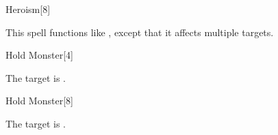 \begin{spellsection}[Greater]{Heroism}[8]
    \begin{spellheader}
    \end{spellheader}
    \begin{spellcontent}
        \begin{spelltargetinginfo}
        \end{spelltargetinginfo}
        \begin{spelleffects}
            \spellspecial This spell functions like , except that it affects multiple targets.
        \end{spelleffects}
    \end{spellcontent}
    \begin{spellfooter}
        \miscastexplode
    \end{spellfooter}
\end{spellsection}

\begin{spellsection}{Hold Monster}[4]
    \begin{spellheader}
    \end{spellheader}
    \begin{spellcontent}
        \begin{spelltargetinginfo}
        \end{spelltargetinginfo}
        \begin{spelleffects}
            \spelleffect The target is \immobilized.
            \spelldur \durshort
        \end{spelleffects}
    \end{spellcontent}
    \begin{spellfooter}
        \miscastrandom
    \end{spellfooter}
\end{spellsection}

\begin{spellsection}[Mass]{Hold Monster}[8]
    \begin{spellheader}
    \end{spellheader}
    \begin{spellcontent}
        \begin{spelltargetinginfo}
        \end{spelltargetinginfo}
        \begin{spelleffects}
            \spelleffect The target is \immobilized.
            \spelldur \durshort
        \end{spelleffects}
    \end{spellcontent}
    \begin{spellfooter}
        \miscastexplode
    \end{spellfooter}
\end{spellsection}

